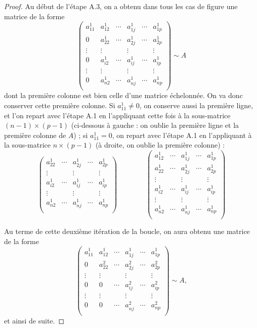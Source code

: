 \documentclass[class=report,crop=false]{standalone}
\begin{document}
\begin{proof}
Au début de l'étape A.3, on a obtenu dans tous les cas de figure une matrice de la forme
$$\begin{pmatrix}
a^1_{11}&a^1_{12}&\cdots&a^1_{1j}&\cdots&a^1_{1p}\\
0&a^1_{22}&\cdots&a^1_{2j}&\cdots&a^1_{2p}\\
\vdots&\vdots&&\vdots&&\vdots\\
0&a^1_{i2}&\cdots&a^1_{ij}&\cdots&a^1_{ip}\\
\vdots&\vdots&&\vdots&&\vdots\\
0&a^1_{n2}&\cdots&a^1_{nj}&\cdots&a^1_{np}\\
\end{pmatrix}\sim A
$$
dont la première colonne est bien celle d'une matrice échelonnée.
On va donc conserver cette première colonne. Si $a^1_{11}\neq0$,
on conserve aussi la première ligne, et l'on repart avec l'étape A.1
en l'appliquant cette fois à la sous-matrice $(n-1)\times(p-1)$
(ci-dessous à gauche : on \og oublie \fg{} la première ligne et la première colonne de $A$) ;
si $a^1_{11}=0$, on repart avec l'étape A.1 en l'appliquant à la sous-matrice
$n\times(p-1)$ (à droite, on \og oublie \fg{} la première colonne) :
$$\begin{pmatrix}
a^1_{22}&\cdots&a^1_{2j}&\cdots&a^1_{2p}\\
\vdots&&\vdots&&\vdots\\
a^1_{i2}&\cdots&a^1_{ij}&\cdots&a^1_{ip}\\
\vdots&&\vdots&&\vdots\\
a^1_{n2}&\cdots&a^1_{nj}&\cdots&a^1_{np}\\
\end{pmatrix}
\qquad \qquad
\begin{pmatrix}
a^1_{12}&\cdots&a^1_{1j}&\cdots&a^1_{1p}\\
a^1_{22}&\cdots&a^1_{2j}&\cdots&a^1_{2p}\\
\vdots&&\vdots&&\vdots\\
a^1_{i2}&\cdots&a^1_{ij}&\cdots&a^1_{ip}\\
\vdots&&\vdots&&\vdots\\
a^1_{n2}&\cdots&a^1_{nj}&\cdots&a^1_{np}\\
\end{pmatrix}
$$

Au terme de cette deuxième itération de la boucle, on aura obtenu une matrice de la forme
$$\begin{pmatrix}
a^1_{11}&a^1_{12}&\cdots&a^1_{1j}&\cdots&a^1_{1p}\\
0&a^2_{22}&\cdots&a^2_{2j}&\cdots&a^2_{2p}\\
\vdots&\vdots&&\vdots&&\vdots\\
0&0&\cdots&a^2_{ij}&\cdots&a^2_{ip}\\
\vdots&\vdots&&\vdots&&\vdots\\
0&0&\cdots&a^2_{nj}&\cdots&a^2_{np}\\
\end{pmatrix}\sim A,
$$
et ainsi de suite.


\end{proof}
\end{document}
